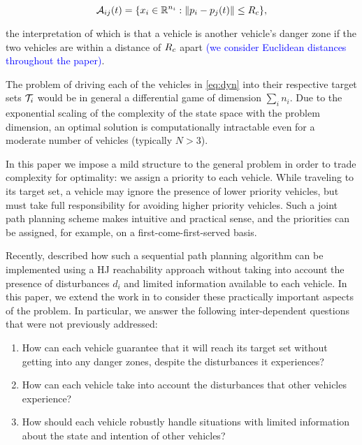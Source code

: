 \begin{equation}
\mathcal{A}_{ij}(t) = \{x_i \in \mathbb{R}^{n_i}: \|p_i - p_j(t)\| \le R_c \},
\end{equation}

\noindent the interpretation of which is that a vehicle is another vehicle's danger zone if the two vehicles are within a distance of $R_c$ apart \textcolor{blue}{(we consider Euclidean distances throughout the paper)}.

The problem of driving each of the vehicles in \eqref{eq:dyn} into their respective target sets $\mathcal{T}_i$ would be in general a differential game of dimension $\sum_i n_i$. Due to the exponential scaling of the complexity of the state space with the problem dimension, an optimal solution is computationally intractable even for a moderate number of vehicles (typically $N>3$).

In this paper we impose a mild structure to the general problem in order to trade complexity for optimality: we assign a priority to each vehicle.  While traveling to its target set, a vehicle may ignore the presence of lower priority vehicles, but must take full responsibility for avoiding higher priority vehicles. Such a joint path planning scheme makes intuitive and practical sense, and the priorities can be assigned, for example, on a first-come-first-served basis.

Recently, \cite{Chen15} described how such a sequential path planning algorithm can be implemented using a HJ reachability approach without taking into account the presence of disturbances $d_i$ and limited information available to each vehicle. In this paper, we extend the work in \cite{Chen15} to consider these practically important aspects of the problem. In particular, we answer the following inter-dependent questions that were not previously addressed:

\begin{enumerate}
\item How can each vehicle guarantee that it will reach its target set without getting into any danger zones, despite the disturbances it experiences?
\item How can each vehicle take into account the disturbances that other vehicles experience?
\item How should each vehicle robustly handle situations with limited information about the state and intention of other vehicles?
\end{enumerate}